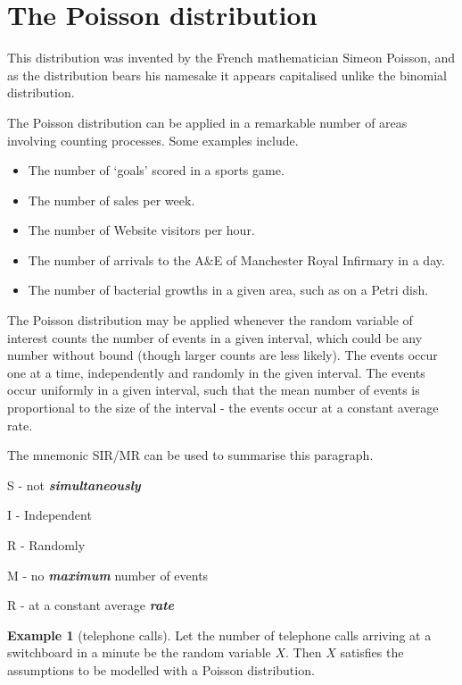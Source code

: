 \documentclass[
]{book}
\theoremstyle{definition}
\theoremstyle{definition}
\newtheorem{example}{Example}[chapter]
\theoremstyle{definition}
\theoremstyle{definition}
\theoremstyle{remark}
\begin{document}
\hypertarget{the-poisson-distribution}{%
\section{The Poisson distribution}\label{the-poisson-distribution}}

This distribution was invented by the French mathematician Simeon Poisson, and as the distribution bears his namesake it appears capitalised unlike the binomial distribution.

The Poisson distribution can be applied in a remarkable number of areas involving counting processes. Some examples include.

\begin{itemize}
\item
  The number of `goals' scored in a sports game.
\item
  The number of sales per week.
\item
  The number of Website visitors per hour.
\item
  The number of arrivals to the A\&E of Manchester Royal Infirmary in a day.
\item
  The number of bacterial growths in a given area, such as on a Petri dish.
\end{itemize}

The Poisson distribution may be applied whenever the random variable of interest counts the number of events in a given interval, which could be any number without bound (though larger counts are less likely). The events occur one at a time, independently and randomly in the given interval. The events occur uniformly in a given interval, such that the mean number of events is proportional to the size of the interval - the events occur at a constant average rate.

The mnemonic SIR/MR can be used to summarise this paragraph.

S - not \textbf{\emph{simultaneously}}

I - Independent

R - Randomly

M - no \textbf{\emph{maximum}} number of events

R - at a constant average \textbf{\emph{rate}}

\begin{example}[telephone calls]
Let the number of telephone calls arriving at a switchboard in a minute be the random variable \(X\). Then \(X\) satisfies the assumptions to be modelled with a Poisson distribution.
\end{example}
\end{document}
